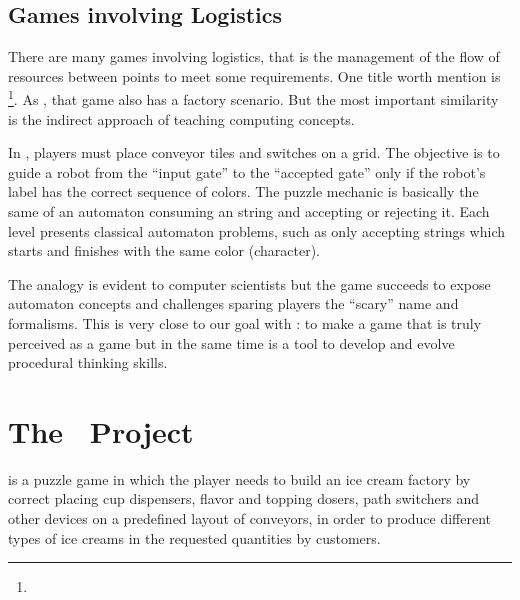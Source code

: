 \documentclass{sigchi}
\begin{document}
    \subsection{Games involving Logistics}
        There are many games involving logistics, that is the management of the
        flow of resources between points to meet some requirements. One title
        worth mention is \manufactoria \footnote{\manufactoriasite}. As
        \gamename, that game also has a factory scenario. But the most important
        similarity is the indirect approach of teaching computing concepts.

        In \manufactoria, players must place conveyor tiles and switches on a
        grid. The objective is to guide a robot from the ``input gate'' to the
        ``accepted gate'' only if the robot's label has the correct sequence of
        colors. The puzzle mechanic is basically the same of an automaton
        consuming an string and accepting or rejecting it. Each level presents
        classical automaton problems, such as only accepting strings which
        starts and finishes with the same color (character).

        The analogy is evident to computer scientists but the game succeeds to
        expose automaton concepts and challenges sparing players the ``scary''
        name and formalisms. This is very close to our goal with \gamename: to
        make a game that is truly perceived as a game but in the same time is a
        tool to develop and evolve procedural thinking skills.

\section{The \gamename\ Project}
    \gamename is a puzzle game in which the player needs to build an ice cream
    factory by correct placing cup dispensers, flavor and topping dosers, path
    switchers and other devices on a predefined layout of conveyors, in order to
    produce different types of ice creams in the requested quantities by
    customers.
\end{document}

